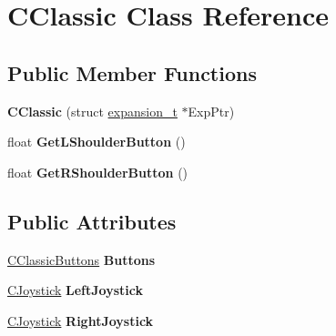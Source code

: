 \hypertarget{class_c_classic}{\section{C\-Classic Class Reference}
\label{class_c_classic}
}
\subsection*{Public Member Functions}
\begin{DoxyCompactItemize}
\item 
\hypertarget{class_c_classic_ac682fe2a19e88a0dd1fff9a12586d6e2}{{\bfseries C\-Classic} (struct \hyperlink{structexpansion__t}{expansion\-\_\-t} $\ast$Exp\-Ptr)}\label{class_c_classic_ac682fe2a19e88a0dd1fff9a12586d6e2}

\item 
\hypertarget{class_c_classic_a7ea18d3535fb4534790a6b24e33e8c56}{float {\bfseries Get\-L\-Shoulder\-Button} ()}\label{class_c_classic_a7ea18d3535fb4534790a6b24e33e8c56}

\item 
\hypertarget{class_c_classic_a58ac294e9273589037f60a1d2e4fcfac}{float {\bfseries Get\-R\-Shoulder\-Button} ()}\label{class_c_classic_a58ac294e9273589037f60a1d2e4fcfac}

\end{DoxyCompactItemize}
\subsection*{Public Attributes}
\begin{DoxyCompactItemize}
\item 
\hypertarget{class_c_classic_a1592d3c639fa90e657cc3c3f741363b8}{\hyperlink{class_c_classic_buttons}{C\-Classic\-Buttons} {\bfseries Buttons}}\label{class_c_classic_a1592d3c639fa90e657cc3c3f741363b8}

\item 
\hypertarget{class_c_classic_a3469e965eac46db5ecc669d74d8a2420}{\hyperlink{class_c_joystick}{C\-Joystick} {\bfseries Left\-Joystick}}\label{class_c_classic_a3469e965eac46db5ecc669d74d8a2420}

\item 
\hypertarget{class_c_classic_a65a96a9397c278e0bc5e7f5b7048d855}{\hyperlink{class_c_joystick}{C\-Joystick} {\bfseries Right\-Joystick}}\label{class_c_classic_a65a96a9397c278e0bc5e7f5b7048d855}

\end{DoxyCompactItemize}
